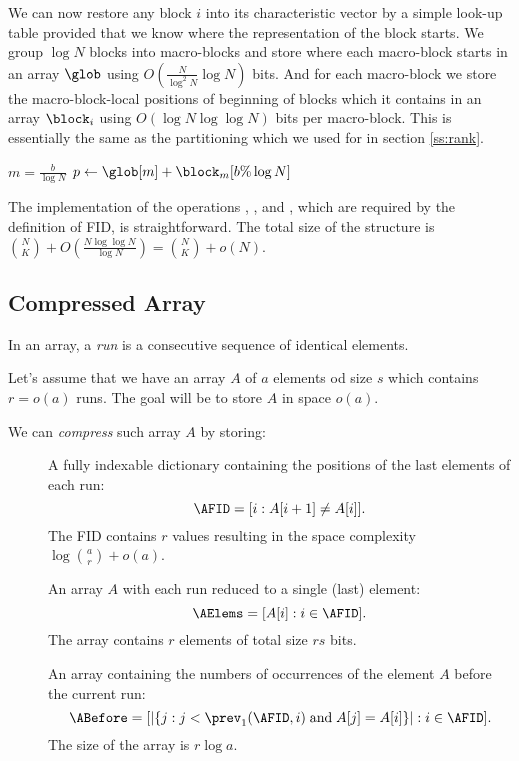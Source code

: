 We can now restore any block $i$ into its characteristic vector by a simple look-up table provided that we know where the representation of the block starts.
We group $\log N$ blocks into macro-blocks and store where each macro-block starts in an array $\glob$ using $O(\frac{N}{\log^2 N} \log N)$ bits.
And for each macro-block we store the macro-block-local positions of beginning of blocks which it contains in an array $\block_i$ using $O(\log N \log \log N)$ bits per macro-block.
This is essentially the same as the partitioning which we used for \rank{} in section \ref{ss:rank}.

\begin{algorithm}
\begin{algorithmic}
 
	\State $m = \frac{b}{\log N}$
	\State $p \gets \glob[m] + \block_m[b \% \log N]$
	\State {}
\EndFunction
\end{algorithmic}
\end{algorithm}

The implementation of the operations \rank{}, \select{}, and \inspect{}, which are required by the definition of FID, is straightforward.
The total size of the structure is ${N \choose K} + O(\frac{N \log \log N}{\log N}) = {N \choose K} + o(N)$.

\subsection{Compressed Array}\label{s:compressed-array}

In an array, a \emph{run} is a consecutive sequence of identical elements.

Let's assume that we have an array $A$ of $a$ elements od size $s$ which contains $r = o(a)$ runs.
The goal will be to store $A$ in space $o(a)$.

We can \emph{compress} such array $A$ by storing:
\begin{description}
	\item[\AFID]
	A fully indexable dictionary containing the positions of the last elements of each run:
	$$ \AFID = [i : A[i + 1] \ne A[i]]. $$
	The FID contains $r$ values resulting in the space complexity $\log {a \choose r} + o(a)$.

	\item[\AElems]
	An array $A$ with each run reduced to a single (last) element:
	$$ \AElems = [A[i] : i \in \AFID]. $$
	The array contains $r$ elements of total size $rs$ bits.
	
	\item[\ABefore]
	An array containing the numbers of occurrences of the element $A$ before the current run:
	$$ \ABefore = [|\{ j : j < \prev_1(\AFID, i) \booland A[j] = A[i] \}| : i \in \AFID ]. $$
	The size of the array is $r \log a$.
\end{description}

